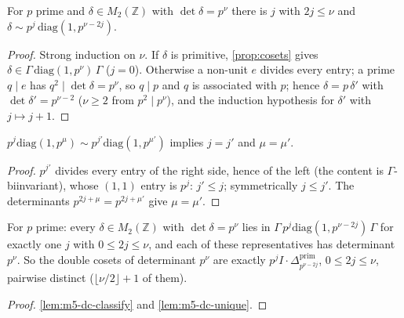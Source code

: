 \begin{lemma}\label{lem:m5-dc-classify}
  \leanok
  For $p$ prime and $\delta\in M_2(\mathbb Z)$ with $\det\delta=p^\nu$ there is $j$ with $2j\le\nu$ and
  $\delta\sim p^j\,\mathrm{diag}(1,p^{\nu-2j})$.
\end{lemma}
\begin{proof}
  \leanok
  Strong induction on $\nu$. If $\delta$ is primitive, \ref{prop:cosets} gives $\delta\in\Gamma\,\mathrm{diag}(1,p^\nu)\,\Gamma$
  ($j=0$). Otherwise a non-unit $e$ divides every entry; a prime $q\mid e$ has $q^2\mid\det\delta=p^\nu$, so $q\mid p$ and $q$ is
  associated with $p$; hence $\delta=p\,\delta'$ with $\det\delta'=p^{\nu-2}$ ($\nu\ge2$ from $p^2\mid p^\nu$), and the
  induction hypothesis for $\delta'$ with $j\mapsto j+1$.
\end{proof}

\begin{lemma}[Distinctness]\label{lem:m5-dc-unique}
  \leanok
  $p^j\mathrm{diag}(1,p^\mu)\sim p^{j'}\mathrm{diag}(1,p^{\mu'})$ implies $j=j'$ and $\mu=\mu'$.
\end{lemma}
\begin{proof}
  \leanok
  $p^{j'}$ divides every entry of the right side, hence of the left (the content is $\Gamma$-biinvariant), whose $(1,1)$ entry is
  $p^j$: $j'\le j$; symmetrically $j\le j'$. The determinants $p^{2j+\mu}=p^{2j+\mu'}$ give $\mu=\mu'$.
\end{proof}

\begin{theorem}\label{thm:m5-dc-enum}
  \leanok
  For $p$ prime: every $\delta\in M_2(\mathbb Z)$ with $\det\delta=p^\nu$ lies in $\Gamma\,p^j\mathrm{diag}(1,p^{\nu-2j})\,\Gamma$ for
  exactly one $j$ with $0\le2j\le\nu$, and each of these representatives has determinant $p^\nu$. So the double cosets of
  determinant $p^\nu$ are exactly $p^jI\cdot\Delta^{\mathrm{prim}}_{p^{\nu-2j}}$, $0\le2j\le\nu$, pairwise distinct
  ($\lfloor\nu/2\rfloor+1$ of them).
\end{theorem}
\begin{proof}
  \leanok
  \ref{lem:m5-dc-classify} and \ref{lem:m5-dc-unique}.
\end{proof}

